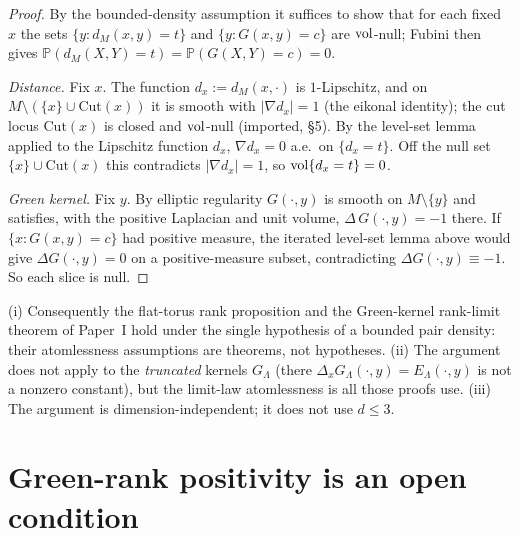 \begin{proof}
By the bounded-density assumption it suffices to show that for each fixed $x$ the sets
$\{y:d_M(x,y)=t\}$ and $\{y:G(x,y)=c\}$ are $\operatorname{vol}$-null; Fubini then gives
$\mathbb P(d_M(X,Y)=t)=\mathbb P(G(X,Y)=c)=0$.

\emph{Distance.} Fix $x$. The function $d_x:=d_M(x,\cdot)$ is $1$-Lipschitz, and on
$M\setminus(\{x\}\cup\mathrm{Cut}(x))$ it is smooth with $\lvert\nabla d_x\rvert=1$
(the eikonal identity); the cut locus $\mathrm{Cut}(x)$ is closed and $\operatorname{vol}$-null
(imported, \S5). By the level-set lemma applied to the Lipschitz function $d_x$,
$\nabla d_x=0$ a.e.\ on $\{d_x=t\}$. Off the null set $\{x\}\cup\mathrm{Cut}(x)$ this
contradicts $\lvert\nabla d_x\rvert=1$, so $\operatorname{vol}\{d_x=t\}=0$.

\emph{Green kernel.} Fix $y$. By elliptic regularity $G(\cdot,y)$ is smooth on
$M\setminus\{y\}$ and satisfies, with the positive Laplacian and unit volume,
$\Delta\,G(\cdot,y)=-1$ there. If $\{x:G(x,y)=c\}$ had positive measure, the iterated
level-set lemma above would give $\Delta G(\cdot,y)=0$ on a positive-measure subset,
contradicting $\Delta G(\cdot,y)\equiv-1$. So each slice is null.
\end{proof}

\begin{remark}
(i) Consequently the flat-torus rank proposition and the Green-kernel rank-limit
theorem of Paper~I hold under the single hypothesis of a bounded pair density: their
atomlessness assumptions are theorems, not hypotheses. (ii) The argument does not
apply to the \emph{truncated} kernels $G_\Lambda$ (there
$\Delta_x G_\Lambda(\cdot,y)=E_\Lambda(\cdot,y)$ is not a nonzero constant), but the
limit-law atomlessness is all those proofs use. (iii) The argument is
dimension-independent; it does not use $d\le3$.
\end{remark}

\section{Green-rank positivity is an open condition}

